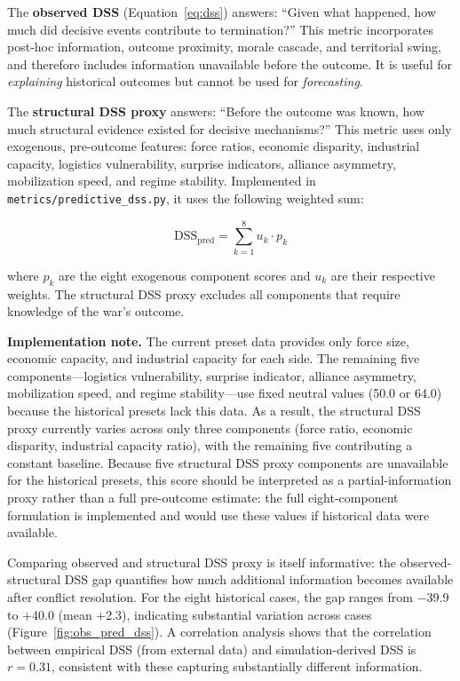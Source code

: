 The \textbf{observed DSS} (Equation~\ref{eq:dss}) answers: ``Given what happened, how much did decisive events contribute to termination?'' This metric incorporates post-hoc information, outcome proximity, morale cascade, and territorial swing, and therefore includes information unavailable before the outcome. It is useful for \emph{explaining} historical outcomes but cannot be used for \emph{forecasting}.

The \textbf{structural DSS proxy} answers: ``Before the outcome was known, how much structural evidence existed for decisive mechanisms?'' This metric uses only exogenous, pre-outcome features: force ratios, economic disparity, industrial capacity, logistics vulnerability, surprise indicators, alliance asymmetry, mobilization speed, and regime stability. Implemented in \texttt{metrics/predictive\_dss.py}, it uses the following weighted sum:

\begin{equation}
\text{DSS}_{\text{pred}} = \sum_{k=1}^{8} u_k \cdot p_k
\label{eq:pred_dss}
\end{equation}

\noindent where $p_k$ are the eight exogenous component scores and $u_k$ are their respective weights. The structural DSS proxy excludes all components that require knowledge of the war's outcome.

\textbf{Implementation note.} The current preset data provides only force size, economic capacity, and industrial capacity for each side. The remaining five components---logistics vulnerability, surprise indicator, alliance asymmetry, mobilization speed, and regime stability---use fixed neutral values (50.0 or 64.0) because the historical presets lack this data. As a result, the structural DSS proxy currently varies across only three components (force ratio, economic disparity, industrial capacity ratio), with the remaining five contributing a constant baseline. Because five structural DSS proxy components are unavailable for the historical presets, this score should be interpreted as a partial-information proxy rather than a full pre-outcome estimate: the full eight-component formulation is implemented and would use these values if historical data were available.

Comparing observed and structural DSS proxy is itself informative: the observed-structural DSS gap quantifies how much additional information becomes available after conflict resolution. For the eight historical cases, the gap ranges from $-$39.9 to +40.0 (mean +2.3), indicating substantial variation across cases (Figure~\ref{fig:obs_pred_dss}). A correlation analysis shows that the correlation between empirical DSS (from external data) and simulation-derived DSS is $r = 0.31$, consistent with these capturing substantially different information.

